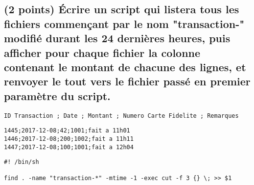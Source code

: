 \documentclass[11pt,a4paper]{article}
\begin{document}

\subsection{(2 points) \'Ecrire un script qui listera tous les fichiers commençant par le nom "transaction-" modifié durant les 24 dernières heures, puis afficher pour chaque fichier la colonne contenant le montant de chacune des lignes, et renvoyer le tout vers le fichier passé en premier paramètre du script.}

\bigskip

\lstset{language=sh}
\begin{lstlisting}[frame=single,title={Format des fichiers de transactions}]
ID Transaction ; Date ; Montant ; Numero Carte Fidelite ; Remarques
\end{lstlisting}

\lstset{language=sh}
\begin{lstlisting}[frame=single,title={transaction-2017-12-08}]
1445;2017-12-08;42;1001;fait a 11h01
1446;2017-12-08;200;1002;fait a 11h11
1447;2017-12-08;100;1001;fait a 12h04
\end{lstlisting}

\bigskip

\lstset{language=sh}
\begin{lstlisting}[frame=single,title={script.sh}]
#! /bin/sh

find . -name "transaction-*" -mtime -1 -exec cut -f 3 {} \; >> $1 
\end{lstlisting}
\end{document}
